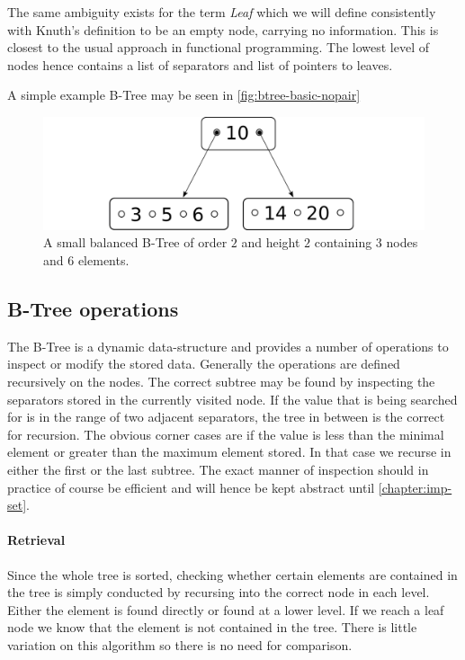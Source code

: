 The same ambiguity exists for the term \textit{Leaf} which we will define consistently with Knuth's definition \parencite{DBLP:books/lib/Knuth98a}
to be an empty node, carrying no information.
This is closest to the usual approach in functional programming.
The lowest level of nodes hence contains a list of separators and
list of pointers to leaves.

A simple example B-Tree may be seen in \autoref{fig:btree-basic-nopair}
\begin{figure}
    \centering
    \includegraphics[width=0.5\linewidth]{figures/btree-basic-nopair.pdf}
    \caption{A small balanced B-Tree of order $2$ and
    height $2$ containing $3$ nodes and $6$ elements.}
    \label{fig:btree-basic-nopair}
\end{figure}

\subsection{B-Tree operations}

The B-Tree is a dynamic data-structure and provides
a number of operations to inspect or modify the stored data.
Generally the operations are defined recursively on the nodes.
The correct subtree may be found by inspecting the separators stored
in the currently visited node.
If the value that is being searched for is in the range of two
adjacent separators, the tree in between is the correct for recursion. 
The obvious corner cases are if the value is less than the
minimal element or greater than the maximum element stored.
In that case we recurse in either the first or the last subtree.
The exact manner of inspection should in practice of course
be efficient and will hence be kept abstract until \autoref{chapter:imp-set}.

\paragraph{Retrieval}\label{par:intro-isin}
Since the whole tree is sorted,
checking whether certain elements are contained in the tree
is simply conducted by recursing into the correct node
in each level.
Either the element is found directly or found at a lower level.
If we reach a leaf node we know that the element is not contained in the tree.
There is little variation on this algorithm so there is no need for comparison.

